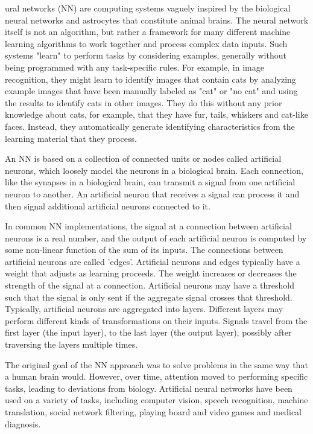 \documentclass[journal]{IEEEtran}
\begin{document}
ural networks (NN) are computing systems vaguely inspired by the biological neural networks and astrocytes that constitute animal brains. The neural network itself is not an algorithm, but rather a framework for many different machine learning algorithms to work together and process complex data inputs. Such systems "learn" to perform tasks by considering examples, generally without being programmed with any task-specific rules. For example, in image recognition, they might learn to identify images that contain cats by analyzing example images that have been manually labeled as "cat" or "no cat" and using the results to identify cats in other images. They do this without any prior knowledge about cats, for example, that they have fur, tails, whiskers and cat-like faces. Instead, they automatically generate identifying characteristics from the learning material that they process.

An NN is based on a collection of connected units or nodes called artificial neurons, which loosely model the neurons in a biological brain. Each connection, like the synapses in a biological brain, can transmit a signal from one artificial neuron to another. An artificial neuron that receives a signal can process it and then signal additional artificial neurons connected to it.

In common NN implementations, the signal at a connection between artificial neurons is a real number, and the output of each artificial neuron is computed by some non-linear function of the sum of its inputs. The connections between artificial neurons are called 'edges'. Artificial neurons and edges typically have a weight that adjusts as learning proceeds. The weight increases or decreases the strength of the signal at a connection. Artificial neurons may have a threshold such that the signal is only sent if the aggregate signal crosses that threshold. Typically, artificial neurons are aggregated into layers. Different layers may perform different kinds of transformations on their inputs. Signals travel from the first layer (the input layer), to the last layer (the output layer), possibly after traversing the layers multiple times.

The original goal of the NN approach was to solve problems in the same way that a human brain would. However, over time, attention moved to performing specific tasks, leading to deviations from biology. Artificial neural networks have been used on a variety of tasks, including computer vision, speech recognition, machine translation, social network filtering, playing board and video games and medical diagnosis.
\end{document}
